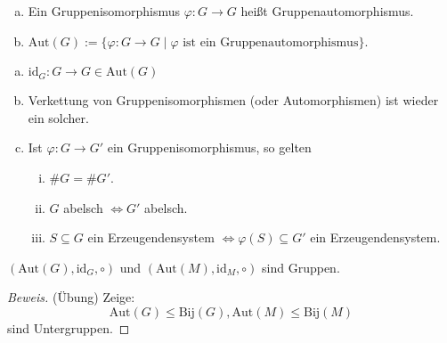 \documentclass[a4paper]{report}
\begin{document}
\begin{defi}
\begin{enumerate}[(a)]
  \item Ein Gruppenisomorphismus $\varphi : G \to G$ heißt Gruppenautomorphismus.
  \item $\mathrm{Aut}(G):= \{\varphi : G \to G \mid \varphi \text{ ist ein Gruppenautomorphismus}\}$.
\end{enumerate}
\end{defi}


\begin{bem}[Übung]
  \begin{enumerate}[(a)]
    \item $\mathrm{id}_{G} : G \to G \in \mathrm{Aut}(G)$
    \item Verkettung von Gruppenisomorphismen (oder Automorphismen) ist wieder ein solcher.
    \item Ist $\varphi : G \to G'$ ein Gruppenisomorphismus, so gelten
          \begin{enumerate}[(i)]
            \item $\#G = \#G'$.
            \item $G$ abelsch $\iff G'$ abelsch.
            \item $S \subseteq G$ ein Erzeugendensystem $\iff \varphi(S) \subseteq G'$ ein Erzeugendensystem.
          \end{enumerate}
  \end{enumerate}
\end{bem}


\begin{prop} $(\mathrm{Aut}(G), \mathrm{id}_{G}, \circ)$ und $(\mathrm{Aut}(M), \mathrm{id}_{M}, \circ)$ sind Gruppen.
  \begin{proof}[Beweis](Übung) Zeige: $$\mathrm{Aut}(G) \le \mathrm{Bij}(G) , \mathrm{Aut}(M) \le \mathrm{Bij}(M)$$
sind Untergruppen.
  \end{proof}
\end{prop}
\end{document}
